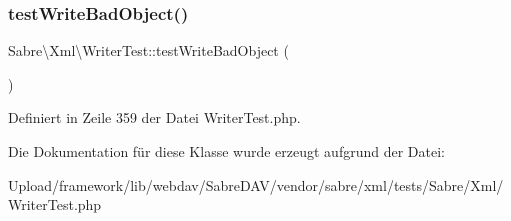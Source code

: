 \subsubsection{\texorpdfstring{test\+Write\+Bad\+Object()}{testWriteBadObject()}}
{\footnotesize\ttfamily Sabre\textbackslash{}\+Xml\textbackslash{}\+Writer\+Test\+::test\+Write\+Bad\+Object (\begin{DoxyParamCaption}{ }\end{DoxyParamCaption})}



Definiert in Zeile 359 der Datei Writer\+Test.\+php.



Die Dokumentation für diese Klasse wurde erzeugt aufgrund der Datei\+:\begin{DoxyCompactItemize}
\item 
Upload/framework/lib/webdav/\+Sabre\+D\+A\+V/vendor/sabre/xml/tests/\+Sabre/\+Xml/Writer\+Test.\+php\end{DoxyCompactItemize}
